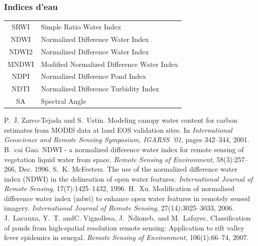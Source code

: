\documentclass[compress]{beamer}
\begin{document}
\begin{frame}
\frametitle{Indices d'eau}
\footnotesize \centering
\begin{tabular}{|c|l|}
\hline
SRWI & Simple Ratio Water Index \cite{ZarcoTejada2001-SRWI} \\
NDWI & Normalized Difference Water Index  \cite{Gao1996-NDWI} \\
NDWI2 &  Normalized Difference Water Index \cite{McFeeters1996-NDWI2} \\
MNDWI &  Modified Normalized Difference Water Index  \cite{Xu2006-MNDWI} \\
NDPI &  Normalized Difference Pond Index \cite{Lacaux2007-NDTI} \\
NDTI &  Normalized Difference Turbidity Index  \cite{Lacaux2007-NDTI} \\
SA & Spectral Angle \\
\hline
\end{tabular}
\begin{thebibliography}{noidea}
\tiny
{}
P.~J. Zarco-Tejada and S.~Ustin.
 Modeling canopy water content for carbon estimates from {MODIS} data
  at land {EOS} validation sites.
 In {\em International Geoscience and Remote Sensing Symposium, IGARSS
  '01}, pages 342--344, 2001.
B.~cai Gao.
 {NDWI} - a normalized difference water index for remote sensing of
  vegetation liquid water from space.
 {\em Remote Sensing of Environment}, 58(3):257--266,
        Dec. 1996.
S.~K. McFeeters.
 The use of the normalized difference water index ({NDWI}) in the
  delineation of open water features.
 {\em International Journal of Remote Sensing}, 17(7):1425--1432,
  1996.
H.~Xu.
 Modification of normalised difference water index (ndwi) to enhance
  open water features in remotely sensed imagery.
 {\em International Journal of Remote Sensing}, 27(14):3025--3033,
  2006.
J.~Lacauxa, Y.~T. andC. Vignollesa, J.~Ndioneb, and M.~Lafayec.
 Classification of ponds from high-spatial resolution remote sensing:
  Application to rift valley fever epidemics in senegal.
 {\em Remote Sensing of Environment}, 106(1):66--74, 2007.
\end{thebibliography}
\end{frame}
\end{document}

